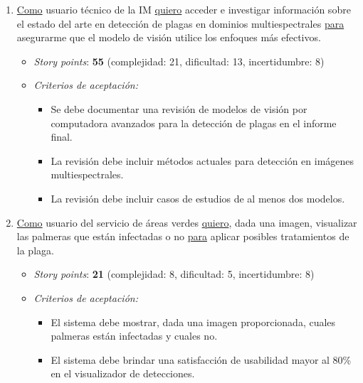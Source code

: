 \documentclass[
11pt, %
]{charter}
\begin{document}
\begin{enumerate}
  \item \underline{Como} usuario técnico de la IM \underline{quiero} acceder e investigar información sobre el estado del arte en detección de plagas en dominios multiespectrales \underline{para} asegurarme que el modelo de visión utilice los enfoques más efectivos.
        \begin{itemize}
          \item \textit{Story points}: \textbf{55} (complejidad: 21, dificultad: 13, incertidumbre: 8)
          \item \textit{Criterios de aceptación:}
                \begin{itemize}
                  \item Se debe documentar una revisión de modelos de visión por computadora avanzados para la detección de plagas en el informe final.
                  \item La revisión debe incluir métodos actuales para detección en imágenes multiespectrales.
                  \item La revisión debe incluir casos de estudios de al menos dos modelos.
                \end{itemize}
        \end{itemize}

  \item \underline{Como} usuario del servicio de áreas verdes \underline{quiero}, dada una imagen, visualizar las palmeras que están infectadas o no \underline{para} aplicar posibles tratamientos de la plaga.
        \begin{itemize}
          \item \textit{Story points}: \textbf{21} (complejidad: 8, dificultad: 5, incertidumbre: 8)
          \item \textit{Criterios de aceptación:}
                \begin{itemize}
                  \item El sistema debe mostrar, dada una imagen proporcionada, cuales palmeras están infectadas y cuales no.
                  \item El sistema debe brindar una satisfacción de usabilidad mayor al 80\% en el visualizador de detecciones.
                \end{itemize}
        \end{itemize}


\end{enumerate}
\end{document}
